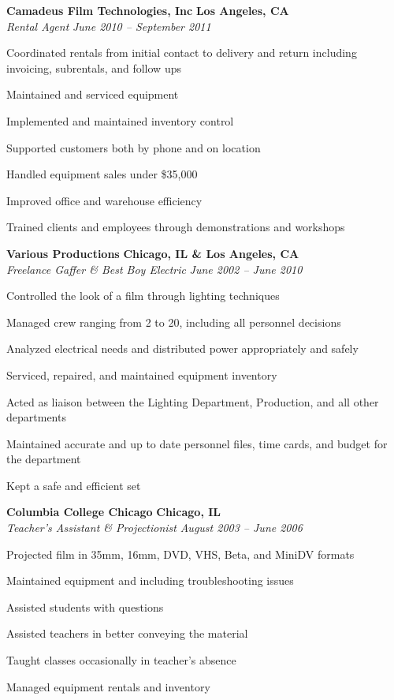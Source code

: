 \documentclass[10pt,letterpaper]{article}			%
\newcommand{\JobHeader}[4]{							%
			\textbf{#1}
			\hfill
			\textbf{#2}
			\\
			\emph{#3}
			\hfill
			\emph{#4}\par}
\begin{document}
\JobHeader{Camadeus Film Technologies, Inc}{Los Angeles, CA}{Rental Agent}{June 2010 -- September 2011}
	\begin{itemize*}
	\item Coordinated rentals from initial contact to delivery and return including invoicing, subrentals, and follow ups
	\item Maintained and serviced equipment
	\item Implemented and maintained inventory control
	\item Supported customers both by phone and on location
	\item Handled equipment sales under \$35,000
	\item Improved office and warehouse efficiency
	\item Trained clients and employees through demonstrations and workshops
	\end{itemize*}

\JobHeader{Various Productions}{Chicago, IL \& Los Angeles, CA}{Freelance Gaffer \& Best Boy Electric}{June 2002 -- June 2010}
	\begin{itemize*}
	\item Controlled the look of a film through lighting techniques 
	\item Managed crew ranging from 2 to 20, including all personnel decisions
	\item Analyzed electrical needs and distributed power appropriately and safely
	\item Serviced, repaired, and maintained equipment inventory
	\item Acted as liaison between the Lighting Department, Production, and all other departments
	\item Maintained accurate and up to date personnel files, time cards, and budget for the department
	\item Kept a safe and efficient set
	\end{itemize*}

\JobHeader{Columbia College Chicago}{Chicago, IL}{Teacher's Assistant \& Projectionist}{August 2003 -- June 2006}
	\begin{itemize*}
	\item Projected film in 35mm, 16mm, DVD, VHS, Beta, and MiniDV formats 
	\item Maintained equipment and including troubleshooting issues 
	\item Assisted students with questions 
	\item Assisted teachers in better conveying the material 
	\item Taught classes occasionally in teacher's absence
	\item Managed equipment rentals and inventory
	\end{itemize*}
	
\end{document}
